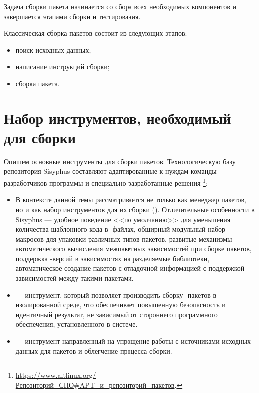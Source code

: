 
Задача сборки пакета начинается со сбора всех необходимых компонентов и завершается этапами сборки и тестирования.

Классическая сборка пакетов  состоит из следующих этапов:%

\begin{itemize}
	\item поиск исходных данных;
	\item написание инструкций сборки;
	\item сборка пакета.
\end{itemize}

\section{Набор инструментов, необходимый для сборки}

Опишем основные инструменты для сборки пакетов. Технологическую
базу репозитория Sisyphus составляют адаптированные к нуждам команды разработчиков
программы и специально разработанные решения%
\footnote{\href{https://www.altlinux.org/\%D0\%A0\%D0\%B5\%D0\%BF\%D0\%BE\%D0\%B7\%D0\%B8\%D1\%82\%D0\%BE\%D1\%80\%D0\%B8\%D0\%B9_\%D0\%A1\%D0\%9F\%D0\%9E\#APT_\%D0\%B8_\%D1\%80\%D0\%B5\%D0\%BF\%D0\%BE\%D0\%B7\%D0\%B8\%D1\%82\%D0\%BE\%D1\%80\%D0\%B8\%D0\%B9_\%D0\%BF\%D0\%B0\%D0\%BA\%D0\%B5\%D1\%82\%D0\%BE\%D0\%B2}{https://www.altlinux.org/Репозиторий\_СПО\#APT\_и\_репозиторий\_пакетов}.}:
\begin{itemize}
	\item {}  В контексте данной темы  рассматривается не только как менеджер пакетов,
		но и как набор инструментов для их сборки (). Отличительные особенности 
		в Sisyphus --- удобное поведение <<по умолчанию>> для уменьшения количества шаблонного кода
		в -файлах, обширный модульный набор
		макросов для упаковки различных типов пакетов, развитые механизмы автоматического вычисления
		межпакетных зависимостей при сборке пакетов, поддержка -версий в зависимостях на
		разделяемые библиотеки, автоматическое создание пакетов с отладочной информацией с поддержкой
		зависимостей между такими пакетами.
	\item {} --- инструмент, который позволяет производить сборку -пакетов в изолированной среде,
		что обеспечивает повышенную безопасность и идентичный результат, не зависимый от стороннего
		программного обеспечения, установленного в системе.
	\item {} --- инструмент направленный на упрощение работы с источниками исходных данных для пакетов
		и облегчение процесса сборки.
\end{itemize}


